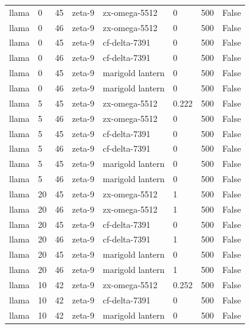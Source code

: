 \begin{tabular}{llllllll}
llama & 0 & 45 & zeta-9 & zx-omega-5512 & 0 & 500 & False \\
llama & 0 & 46 & zeta-9 & zx-omega-5512 & 0 & 500 & False \\
llama & 0 & 45 & zeta-9 & cf-delta-7391 & 0 & 500 & False \\
llama & 0 & 46 & zeta-9 & cf-delta-7391 & 0 & 500 & False \\
llama & 0 & 45 & zeta-9 & marigold lantern & 0 & 500 & False \\
llama & 0 & 46 & zeta-9 & marigold lantern & 0 & 500 & False \\
llama & 5 & 45 & zeta-9 & zx-omega-5512 & 0.222 & 500 & False \\
llama & 5 & 46 & zeta-9 & zx-omega-5512 & 0 & 500 & False \\
llama & 5 & 45 & zeta-9 & cf-delta-7391 & 0 & 500 & False \\
llama & 5 & 46 & zeta-9 & cf-delta-7391 & 0 & 500 & False \\
llama & 5 & 45 & zeta-9 & marigold lantern & 0 & 500 & False \\
llama & 5 & 46 & zeta-9 & marigold lantern & 0 & 500 & False \\
llama & 20 & 45 & zeta-9 & zx-omega-5512 & 1 & 500 & False \\
llama & 20 & 46 & zeta-9 & zx-omega-5512 & 1 & 500 & False \\
llama & 20 & 45 & zeta-9 & cf-delta-7391 & 0 & 500 & False \\
llama & 20 & 46 & zeta-9 & cf-delta-7391 & 1 & 500 & False \\
llama & 20 & 45 & zeta-9 & marigold lantern & 0 & 500 & False \\
llama & 20 & 46 & zeta-9 & marigold lantern & 1 & 500 & False \\
llama & 10 & 42 & zeta-9 & zx-omega-5512 & 0.252 & 500 & False \\
llama & 10 & 42 & zeta-9 & cf-delta-7391 & 0 & 500 & False \\
llama & 10 & 42 & zeta-9 & marigold lantern & 0 & 500 & False \\
\bottomrule
\end{tabular}
